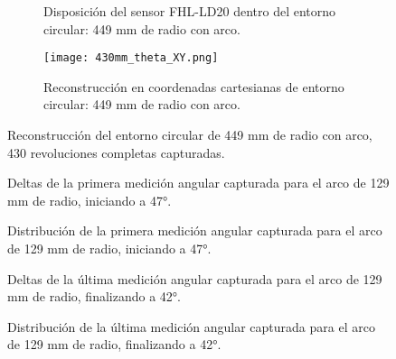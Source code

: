 \begin{figure}[H]
	\centering
	\begin{subfigure}{0.45\textwidth}
		\centering
		\caption{Disposición del sensor FHL-LD20 dentro del entorno circular: 449 mm de radio con arco.}
		\label{fig:disposicion_lidar_theta7}
	\end{subfigure}
	\hspace{1em}
	\begin{subfigure}{0.45\textwidth}
		\centering
		\texttt{[image: 430mm\_theta\_XY.png]}
		\caption{Reconstrucción en coordenadas cartesianas de entorno circular: 449 mm de radio con arco.}
		\label{fig:449m_radius_xy_theta7}
	\end{subfigure}
	\caption{Reconstrucción del entorno circular de 449 mm de radio con arco, 430 revoluciones completas capturadas.}
	\label{fig:disposicion_lidar_var_theta7}
\end{figure}

\begin{figure}[H]
	\centering
	\caption{Deltas de la primera medición angular capturada para el arco de 129 mm de radio, iniciando a 47°.}
	\label{fig:lecturas_theta47_1}
\end{figure}

\begin{figure}[H]
	\centering
	\caption{Distribución de la primera medición angular capturada para el arco de 129 mm de radio, iniciando a 47°.}
	\label{fig:histograma_theta47_1}
\end{figure}

\begin{figure}[H]
	\centering
	\caption{Deltas de la última medición angular capturada para el arco de 129 mm de radio, finalizando a 42°.}
	\label{fig:lecturas_theta42_1}
\end{figure}

\begin{figure}[H]
	\centering
	\caption{Distribución de la última medición angular capturada para el arco de 129 mm de radio, finalizando a 42°.}
	\label{fig:histograma_theta42_1}
\end{figure}


